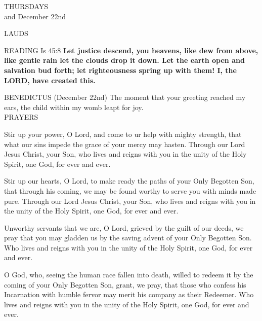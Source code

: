 \begin{center}\normalsize{\uppercase{Thursdays}}\\
\footnotesize{and December 22nd}\end{center}
\begin{flushleft}\normalsize{\uppercase{Lauds\\}}\end{flushleft}
\noindent\small{\uppercase{Reading}} Is 45:8 \textbf{ Let justice descend, you heavens, like dew from above, like gentle rain let the clouds drop it down. Let the earth open and salvation bud forth; let righteousness spring up with them! I, the LORD, have created this.\\}

\noindent\small{\uppercase{Benedictus}} (December 22nd)
The moment that your greeting reached my ears, the child within my womb leapt for joy.\\

\noindent\small{\uppercase{Prayers}}\begin{description}[labelindent=\parindent, leftmargin=*]
\item [Week 1] Stir up your power, O Lord, and come to ur help with mighty strength, that what our sins impede the grace of your mercy may hasten. Through our Lord Jesus Christ, your Son, who lives and reigns with you in the unity of the Holy Spirit, one God, for ever and ever.
\item [Week 2] Stir up our hearts, O Lord, to make ready the paths of your Only Begotten Son, that through his coming, we may be found worthy to serve you with minds made pure. Through our Lord Jesus Christ, your Son, who lives and reigns with you in the unity of the Holy Spirit, one God, for ever and ever.
\item [Week 3] Unworthy servants that we are, O Lord, grieved by the guilt of our deeds, we pray that you may gladden us by the saving advent of your Only Begotten Son. Who lives and reigns with you in the unity of the Holy Spirit, one God, for ever and ever.
\item [December 22nd] O God, who, seeing the human race fallen into death, willed to redeem it by the coming of your Only Begotten Son, grant, we pray, that those who confess his Incarnation with humble fervor may merit his company as their Redeemer. Who lives and reigns with you in the unity of the Holy Spirit, one God, for ever and ever.
\end{description}

